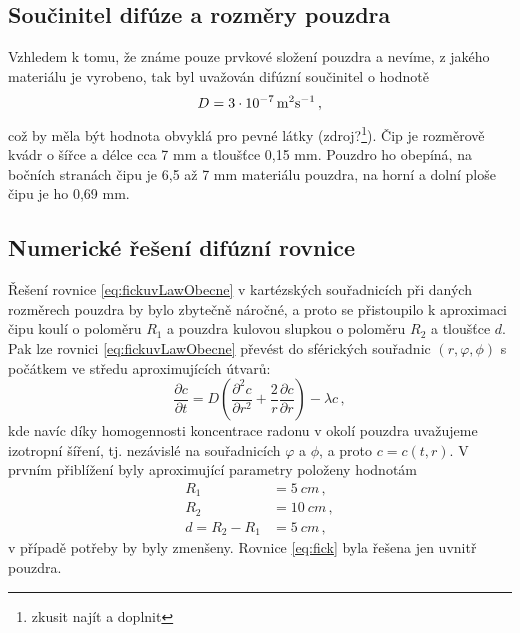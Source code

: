 \documentclass[11pt,a4paper]{article}
\begin{document}
\subsection{Součinitel difúze a rozměry pouzdra}
Vzhledem k tomu, že známe pouze prvkové složení pouzdra a nevíme, z jakého materiálu je vyrobeno, tak byl uvažován difúzní součinitel o hodnotě
\begin{equation}
D=\SI[parse-numbers = false]{3\cdot 10^{-7}}{m^2s^{-1}}\,,
\end{equation}
což by měla být hodnota obvyklá pro pevné látky (zdroj?\footnote{zkusit najít a doplnit}). Čip je rozměrově kvádr o šířce a délce cca 7 mm a tloušťce 0,15 mm. Pouzdro ho obepíná, na bočních stranách čipu je 6,5 až 7 mm materiálu pouzdra, na horní a dolní ploše čipu je ho 0,69 mm. 

\subsection{Numerické řešení difúzní rovnice}\label{pol:aproximace}
Řešení rovnice \eqref{eq:fickuvLawObecne} v kartézských souřadnicích při daných rozměrech pouzdra by bylo zbytečně náročné, a proto se přistoupilo k aproximaci čipu koulí o poloměru $R_1$ a pouzdra kulovou slupkou o poloměru $R_2$ a tloušťce $d$. Pak lze rovnici \eqref{eq:fickuvLawObecne} převést do sférických souřadnic $(r, \varphi, \phi)$ s počátkem ve středu aproximujících útvarů:
\begin{equation}
\frac{\partial c}{\partial t}=D\left(\frac{\partial^2c}{\partial r^2}+\frac{2}{r}\frac{\partial c}{\partial r}\right)-\lambda c\,,\label{eq:fick}
\end{equation}
kde navíc díky homogennosti koncentrace radonu v okolí pouzdra uvažujeme izotropní šíření, tj. nezávislé na souřadnicích $\varphi$ a $\phi$, a proto $c=c(t,r)$. V prvním přiblížení byly aproximující parametry položeny hodnotám
\begin{align}
	R_1&=\SI{5}{cm}\,,\\
	R_2&=\SI{10}{cm}\,,\\
	d=R_2-R_1&=\SI{5}{cm}\,,
\end{align}
v případě potřeby by byly zmenšeny. Rovnice \eqref{eq:fick} byla řešena jen uvnitř pouzdra. 
\end{document}
